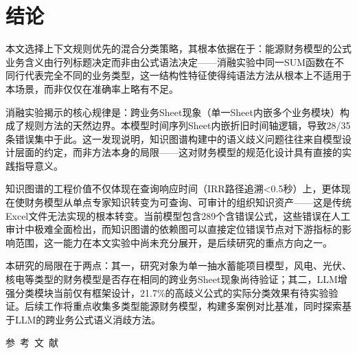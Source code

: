 \section{\heiti 结论}

本文选择上下文规则优先的混合分类策略，其根本依据在于：能源财务模型的公式业务含义由行列标题决定而非由公式语法决定——消融实验中同一SUM函数在不同行代表完全不同的业务类型，这一结构性特征使得纯语法方法从根本上不适用于本场景，而非仅仅在准确率上略有不足。

消融实验揭示的核心规律是：跨业务Sheet现象（单一Sheet内嵌多个业务模块）构成了规则方法的天然边界。本模型时间序列Sheet内嵌折旧时间轴逻辑，导致28/35条错误集中于此。这一发现说明，知识图谱构建中的语义歧义问题往往来自模型设计层面的约定，而非方法本身的局限——这对财务模型的规范化设计具有直接的实践指导意义。

知识图谱的工程价值不仅体现在查询响应时间（IRR路径追溯<0.5秒）上，更体现在使财务模型从单点专家知识转变为可查询、可审计的组织知识资产——这是传统Excel文件无法实现的根本转变。当前模型包含289个含错误公式，这些错误在人工审计中极难全面检出，而知识图谱的依赖图可以直接定位错误节点对下游指标的影响范围，这一能力在本文实验中尚未充分展开，是后续研究的重点方向之一。

本研究的局限在于两点：其一，研究对象为单一抽水蓄能项目模型，风电、光伏、核电等类型的财务模型是否存在相同的跨业务Sheet现象尚待验证；其二，LLM增强分类模块当前仅有框架设计，21.7\%的高歧义公式的实际分类效果有待实验验证。后续工作将重点收集多类型能源财务模型，构建多案例对比基准，同时探索基于LLM的跨业务公式语义消歧方法。

\vspace {3mm}

\vspace {5mm}
\centerline
{\textsf{参~考~文~献}}
 \addtolength{\itemsep}{-1em}
\vspace {1.5mm}


